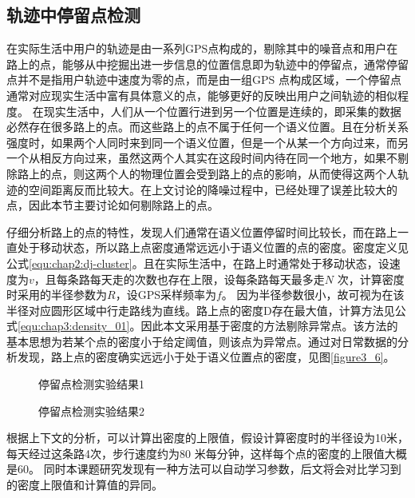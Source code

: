 \subsection{轨迹中停留点检测}
在实际生活中用户的轨迹是由一系列GPS点构成的，剔除其中的噪音点和用户在路上的点，能够从中挖掘出进一步信息的位置信息即为轨迹中的停留点，通常停留点并不是指用户轨迹中速度为零的点，而是由一组GPS 点构成区域，一个停留点通常对应现实生活中富有具体意义的点，能够更好的反映出用户之间轨迹的相似程度。
在现实生活中，人们从一个位置行进到另一个位置是连续的，即采集的数据必然存在很多路上的点。而这些路上的点不属于任何一个语义位置。且在分析关系强度时，如果两个人同时来到同一个语义位置，但是一个从某一个方向过来，而另一个从相反方向过来，虽然这两个人其实在这段时间内待在同一个地方，如果不剔除路上的点，则这两个人的物理位置会受到路上的点的影响，从而使得这两个人轨迹的空间距离反而比较大。在上文讨论的降噪过程中，已经处理了误差比较大的点，因此本节主要讨论如何剔除路上的点。
\par 仔细分析路上的点的特性，发现人们通常在语义位置停留时间比较长，而在路上一直处于移动状态，所以路上点密度通常远远小于语义位置的点的密度。密度定义见公式\ref{equ:chap2:dj-cluster}。且在实际生活中，在路上时通常处于移动状态，设速度为$v$，且每条路每天走的次数也存在上限，设每条路每天最多走$N$ 次，计算密度时采用的半径参数为$R$，设GPS采样频率为$f$。 因为半径参数很小，故可视为在该半径对应圆形区域中行走路线为直线。路上点的密度D存在最大值，计算方法见公式\ref{equ:chap3:density_01}。因此本文采用基于密度的方法剔除异常点。该方法的基本思想为若某个点的密度小于给定阈值，则该点为异常点。通过对日常数据的分析发现，路上点的密度确实远远小于处于语义位置点的密度，见图\ref{figure3_6}。
\begin{figure}[htb]
  \centering%
  \hspace{4em}%
  \caption{停留点检测实验结果1}
  \label{fig:SP_1}
\end{figure}
\begin{figure}[htb]
  \centering%
  \hspace{4em}%
  \caption{停留点检测实验结果2}
  \label{fig:SP_2}
\end{figure}
\par 根据上下文的分析，可以计算出密度的上限值，假设计算密度时的半径设为10米，每天经过这条路4次，步行速度约为80 米每分钟，这样每个点的密度的上限值大概是60。 同时本课题研究发现有一种方法可以自动学习参数，后文将会对比学习到的密度上限值和计算值的异同。
